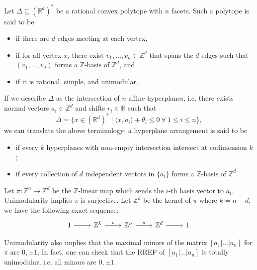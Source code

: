 \documentclass[b5paper]{article}
\begin{document}
Let $\Delta \subseteq (\mathbb{R}^d)^*$ be a rational convex polytope with $n$ facets.
Such a polytope is said to be
\begin{itemize}
    \item {} if there are $d$ edges meeting at each vertex,
    \item {} if for all vertex $x$, there exist $v_1, \dots, v_n \in \mathbb{Z}^d$ that spans the $d$ edges such that $(v_1, \dots, v_d)$ forms a $\mathbb{Z}$-basis of $\mathbb{Z}^d$, and
    \item {} if it is rational, simple, and unimodular.
\end{itemize}
If we describe $\Delta$ as the intersection of $n$ affine hyperplanes, i.e. there exists normal vectors $a_i\in \mathbb{Z}^d$ and shifts $r_i\in\mathbb{R}$ such that 
\begin{equation*}
    \Delta = \{ x \in (\mathbb{R}^d)^* \mid \langle x, a_i \rangle + \theta_i \leq 0 \  \forall\ 1 \leq i \leq n \},
\end{equation*}
we can translate the above terminology: a hyperplane arrangement is said to be
\begin{itemize}
    \item {} if every $k$ hyperplanes with non-empty intersection intersect at codimension $k$;
    \item {} if every collection of $d$ independent vectors in $\{a_i\}$ forms a $\mathbb{Z}$-basis of $\mathbb{Z}^d$.
\end{itemize}
Let $\pi:\mathbb{Z}^n\rightarrow \mathbb{Z}^d$ be the $\mathbb{Z}$-linear map which sends the $i$-th basis vector to $a_i$. Unimodularity implies $\pi$ is surjective. Let $\mathbb{Z}^k$ be the kernel of $\pi$ where $k=n-d$, we have the following exact sequence:
\begin{equation}
  \label{eq:exact_seq_Z}
  \begin{tikzcd}[row sep=small]
    1 \arrow[r] & \mathbb{Z}^k \arrow[r, "\iota"] & \mathbb{Z}^n \arrow[r, "\pi"] & \mathbb{Z}^d \arrow[r] & 1.
  \end{tikzcd}
\end{equation}

Unimodularity also implies that the maximal minors of the matrix $\left[a_1|\dots|a_n\right]$ for $\pi$ are $0,\pm1$. In fact, one can check that the RREF of $\left[a_1|\dots|a_n\right]$ is totally unimodular, i.e. all minors are $0,\pm1$.
\end{document}

